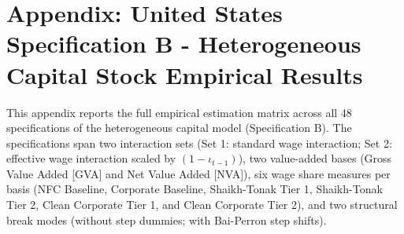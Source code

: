\section{Appendix: United States Specification B - Heterogeneous Capital Stock Empirical Results}
\label{app:specB_full_results}

This appendix reports the full empirical estimation matrix across all 48 specifications of the heterogeneous capital model (Specification B). The specifications span two interaction sets (Set 1: standard wage interaction; Set 2: effective wage interaction scaled by $(1-\iota_{t-1})$), two value-added bases (Gross Value Added [GVA] and Net Value Added [NVA]), six wage share measures per basis (NFC Baseline, Corporate Baseline, Shaikh-Tonak Tier 1, Shaikh-Tonak Tier 2, Clean Corporate Tier 1, and Clean Corporate Tier 2), and two structural break modes (without step dummies; with Bai-Perron step shifts).


